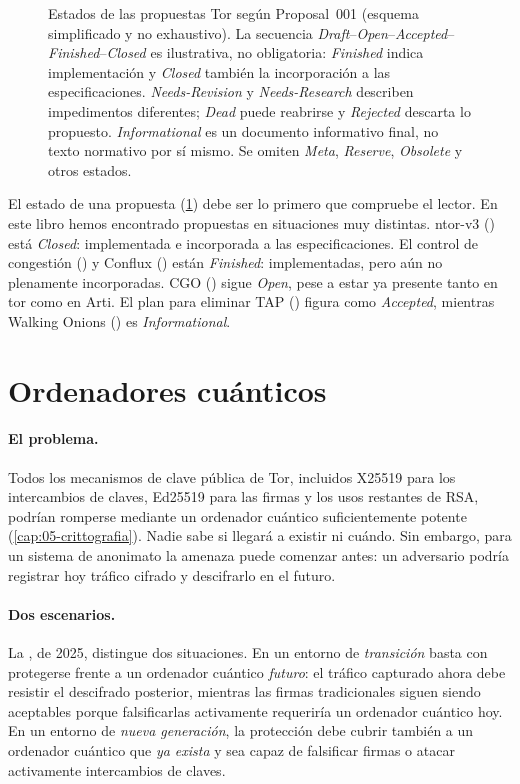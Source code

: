 \begin{figure}[htbp]
\centering

\caption{Estados de las propuestas Tor según Proposal~001 (esquema simplificado y no exhaustivo). La secuencia \emph{Draft}--\emph{Open}--\emph{Accepted}--\emph{Finished}--\emph{Closed} es ilustrativa, no obligatoria: \emph{Finished} indica implementación y \emph{Closed} también la incorporación a las especificaciones. \emph{Needs-Revision} y \emph{Needs-Research} describen impedimentos diferentes; \emph{Dead} puede reabrirse y \emph{Rejected} descarta lo propuesto. \emph{Informational} es un documento informativo final, no texto normativo por sí mismo. Se omiten \emph{Meta}, \emph{Reserve}, \emph{Obsolete} y otros estados.}
\label{fig:proposte}
\end{figure}

El estado de una propuesta (\cref{fig:proposte}) debe ser lo primero que compruebe el lector. En este libro hemos encontrado propuestas en situaciones muy distintas. ntor-v3 () está \emph{Closed}: implementada e incorporada a las especificaciones. El control de congestión () y Conflux () están \emph{Finished}: implementadas, pero aún no plenamente incorporadas. CGO () sigue \emph{Open}, pese a estar ya presente tanto en tor como en Arti. El plan para eliminar TAP () figura como \emph{Accepted}, mientras Walking Onions () es \emph{Informational}.

\section{Ordenadores cuánticos}\label{sec:fut-pq}

\paragraph{El problema.} Todos los mecanismos de clave pública de Tor, incluidos X25519 para los intercambios de claves, Ed25519 para las firmas y los usos restantes de RSA, podrían romperse mediante un ordenador cuántico suficientemente potente (\cref{cap:05-crittografia}). Nadie sabe si llegará a existir ni cuándo. Sin embargo, para un sistema de anonimato la amenaza puede comenzar antes: un adversario podría registrar hoy tráfico cifrado y descifrarlo en el futuro.

\paragraph{Dos escenarios.} La , de 2025, distingue dos situaciones. En un entorno de \emph{transición} basta con protegerse frente a un ordenador cuántico \emph{futuro}: el tráfico capturado ahora debe resistir el descifrado posterior, mientras las firmas tradicionales siguen siendo aceptables porque falsificarlas activamente requeriría un ordenador cuántico hoy. En un entorno de \emph{nueva generación}, la protección debe cubrir también a un ordenador cuántico que \emph{ya exista} y sea capaz de falsificar firmas o atacar activamente intercambios de claves.

